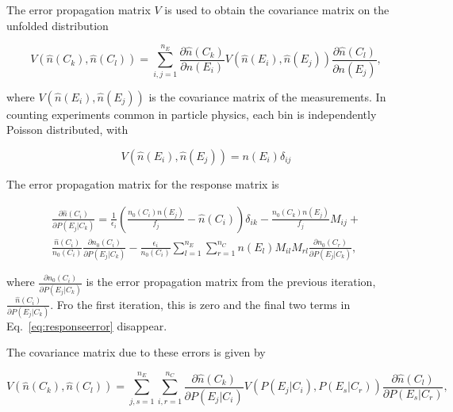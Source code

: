  The error propagation matrix $V$ is used to obtain the covariance matrix on the unfolded distribution 
 
 \begin{equation}
 V\left(\hat n\left(C_k\right), \hat n\left(C_l\right)\right) = \sum_{i,j=1}^{n_E} \frac{\partial \hat n\left(C_k\right) }{\partial n\left(E_i\right) }  V\left(\hat n\left(E_i\right), \hat n\left(E_j\right)\right)  \frac{\partial \hat n\left(C_l\right) }{\partial n\left(E_j\right) },
 \end{equation}
 
 where $V\left(\hat n\left(E_i\right), \hat n\left(E_j\right)\right)$ is the covariance matrix of the measurements. In counting experiments common in particle physics, each bin is independently Poisson distributed, with
 
 \begin{equation}
 V\left(\hat n\left(E_i\right), \hat n\left(E_j\right)\right) = n\left(E_i\right) \delta_{ij}
 \end{equation}
 
 The error propagation matrix for the response matrix is 
 
 \begin{multline}
 \frac{\partial \hat n\left(C_i\right)}{\partial P \left(E_j| C_k\right)} = \frac{1}{\epsilon_i}\left(\frac{n_0 \left(C_i\right) n\left(E_j\right)}{f_j} - \hat n \left(C_i\right) \right) \delta_{ik} - \frac{n_0 \left(C_k\right) n\left(E_j\right)}{f_j} M_{ij} + \\
  \frac{\hat n\left(C_i\right)}{n_0\left(C_i\right)} \frac{\partial n_0\left(C_i\right)}{\partial P \left(E_j| C_k\right)} - \frac{\epsilon_i}{n_0\left(C_i\right)} \sum_{l=1}^{n_E}\sum_{r=1}^{n_C} n\left(E_l\right) M_{il} M_{rl} \frac{\partial n_0 \left(C_r \right)}{\partial P \left(E_j| C_k\right)},
 \label{eq:responseerror}
 \end{multline}
 
 where $ \frac{\partial n_0\left(C_i\right)}{\partial P \left(E_j| C_k\right)}$ is the error propagation matrix from the previous iteration, $\frac{\hat n\left(C_i\right)}{\partial P \left(E_j| C_k\right)}$. Fro the first iteration, this is zero and the final two terms in Eq.~\ref{eq:responseerror} disappear.
 
 The covariance matrix due to these errors is given by
 
 \begin{equation}
 V\left(\hat n\left(C_k\right), \hat n\left(C_l\right)\right) = \sum_{j,s=1}^{n_E} \sum_{i,r=1}^{n_C} \frac{\partial \hat n\left(C_k\right) }{\partial P\left(E_j | C_i\right) }  V\left(P\left(E_j | C_i\right), P\left(E_s | C_r\right) \right)  \frac{\partial \hat n\left(C_l\right) }{\partial P\left(E_s | C_r\right) },
 \end{equation}
 
